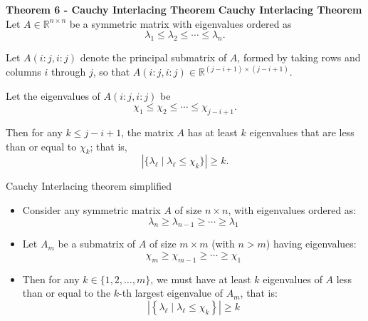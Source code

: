 \documentclass[aspectratio=169]{beamer}
\begin{document}
\begin{frame}{\textbf{Theorem 6 - Cauchy Interlacing Theorem}}
\textbf{Cauchy Interlacing Theorem}  
Let \( A \in \mathbb{R}^{n \times n} \) be a symmetric matrix with eigenvalues ordered as
\[
\lambda_1 \leq \lambda_2 \leq \cdots \leq \lambda_n.
\]

Let \( A(i{:}j, i{:}j) \) denote the principal submatrix of \( A \), formed by taking rows and columns \( i \) through \( j \), so that \( A(i{:}j, i{:}j) \in \mathbb{R}^{(j-i+1) \times (j-i+1)} \). 

Let the eigenvalues of \( A(i{:}j, i{:}j) \) be
\[
\chi_1 \leq \chi_2 \leq \cdots \leq \chi_{j - i + 1}.
\]

Then for any \( k \leq j - i + 1 \), the matrix \( A \) has at least \( k \) eigenvalues that are less than or equal to \( \chi_k \); that is,
\[
| \{ \lambda_\ell \mid \lambda_\ell \leq \chi_k \}| \geq k.
\]
\end{frame}

\begin{frame}{ Cauchy Interlacing theorem simplified}
    \begin{itemize}
        \item Consider any symmetric matrix \( A \) of size \( n \times n \), with eigenvalues ordered as:
        \[
        \lambda_n \geq \lambda_{n-1} \geq \cdots \geq \lambda_1
        \]
        \item Let \( A_m \) be a submatrix of \( A \) of size \( m \times m \) (with \( n > m \)) having eigenvalues:
        \[
        \chi_m \geq \chi_{m-1} \geq \cdots \geq \chi_1
        \]
        \item Then for any \( k \in \{1, 2, \dots, m\} \), we must have at least \( k \) eigenvalues of \( A \) less than or equal to the \( k \)-th largest eigenvalue of \( A_m \), that is:
        \[
        \left| \left\{ \lambda_\ell \mid \lambda_\ell \leq \chi_k \right\} \right| \geq k
        \]
    \end{itemize}
\end{frame}
\end{document}
